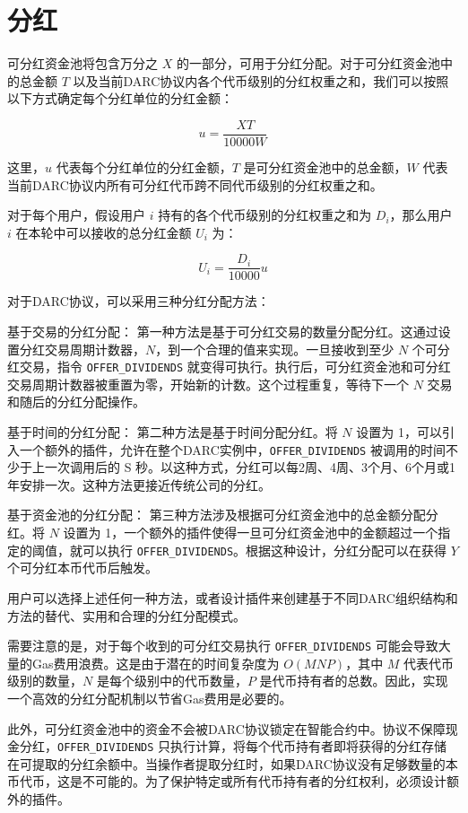 \documentclass[main.tex]{subfiles}
\begin{document}
\section{分红}

可分红资金池将包含万分之 $X$ 的一部分，可用于分红分配。对于可分红资金池中的总金额 $T$ 以及当前DARC协议内各个代币级别的分红权重之和，我们可以按照以下方式确定每个分红单位的分红金额：

\[u = \frac{XT}{10000W}\]

这里，$u$ 代表每个分红单位的分红金额，$T$ 是可分红资金池中的总金额，$W$ 代表当前DARC协议内所有可分红代币跨不同代币级别的分红权重之和。

对于每个用户，假设用户 $i$ 持有的各个代币级别的分红权重之和为 $D_i$，那么用户 $i$ 在本轮中可以接收的总分红金额 $U_i$ 为：

\[ U_i = \frac{D_i}{10000}u\]

对于DARC协议，可以采用三种分红分配方法：

基于交易的分红分配：
第一种方法是基于可分红交易的数量分配分红。这通过设置分红交易周期计数器，$N$，到一个合理的值来实现。一旦接收到至少 $N$ 个可分红交易，指令 \texttt{OFFER\_DIVIDENDS} 就变得可执行。执行后，可分红资金池和可分红交易周期计数器被重置为零，开始新的计数。这个过程重复，等待下一个 $N$ 交易和随后的分红分配操作。

基于时间的分红分配：
第二种方法是基于时间分配分红。将 $N$ 设置为 1，可以引入一个额外的插件，允许在整个DARC实例中，\texttt{OFFER\_DIVIDENDS} 被调用的时间不少于上一次调用后的 S 秒。以这种方式，分红可以每2周、4周、3个月、6个月或1年安排一次。这种方法更接近传统公司的分红。

基于资金池的分红分配：
第三种方法涉及根据可分红资金池中的总金额分配分红。将 $N$ 设置为 1，一个额外的插件使得一旦可分红资金池中的金额超过一个指定的阈值，就可以执行 \texttt{OFFER\_DIVIDENDS}。根据这种设计，分红分配可以在获得 $Y$ 个可分红本币代币后触发。

用户可以选择上述任何一种方法，或者设计插件来创建基于不同DARC组织结构和方法的替代、实用和合理的分红分配模式。

需要注意的是，对于每个收到的可分红交易执行 \texttt{OFFER\_DIVIDENDS} 可能会导致大量的Gas费用浪费。这是由于潜在的时间复杂度为 $O(MNP)$，其中 $M$ 代表代币级别的数量，$N$ 是每个级别中的代币数量，$P$ 是代币持有者的总数。因此，实现一个高效的分红分配机制以节省Gas费用是必要的。

此外，可分红资金池中的资金不会被DARC协议锁定在智能合约中。协议不保障现金分红，\texttt{OFFER\_DIVIDENDS} 只执行计算，将每个代币持有者即将获得的分红存储在可提取的分红余额中。当操作者提取分红时，如果DARC协议没有足够数量的本币代币，这是不可能的。为了保护特定或所有代币持有者的分红权利，必须设计额外的插件。
\end{document}
